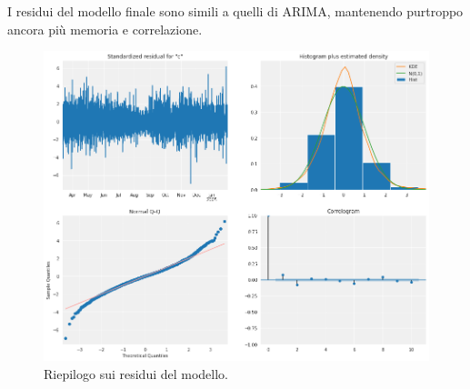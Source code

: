 I residui del modello finale sono simili a quelli di ARIMA, mantenendo purtroppo ancora più memoria e correlazione. 

\begin{figure}[H]
\centering
\includegraphics[width=12cm]{Pictures/summary_ucm.png}
\caption{Riepilogo sui residui del modello.}
\end{figure}


\vspace{0.5cm}